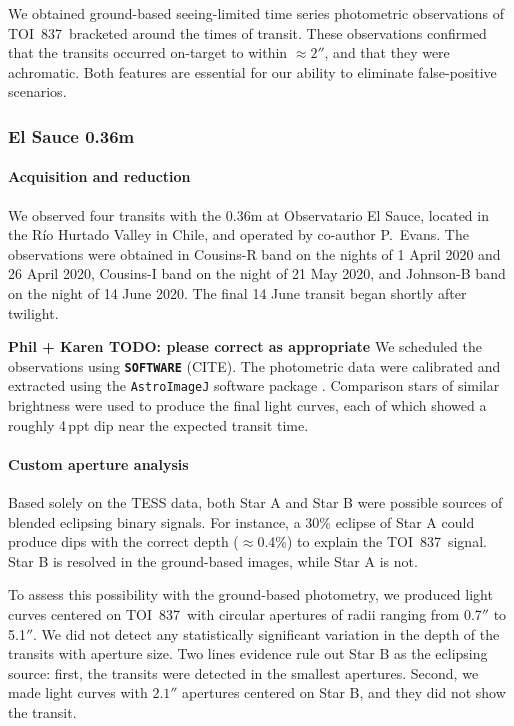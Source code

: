 \documentclass[12pt,twocolumn,tighten]{aastex63}
\newcommand{\tn}{TOI~837} %
\begin{document}
We obtained ground-based seeing-limited time series photometric
observations of \tn\ bracketed around the times of transit.  These
observations confirmed that the transits occurred on-target to within
$\approx 2''$, and that they were achromatic. Both features are
essential for our ability to eliminate false-positive scenarios.

\subsubsection{El Sauce 0.36m}

\paragraph{Acquisition and reduction}
We observed four transits with the 0.36m at Observatario El Sauce,
located in the R\'io Hurtado Valley in Chile, and operated by
co-author P{.}~Evans.  The observations were obtained in Cousins-R
band on the nights of 1 April 2020 and 26 April 2020, Cousins-I band
on the night of 21 May 2020, and Johnson-B band on the night of 14
June 2020.  The final 14 June transit began shortly after twilight.

{\bf Phil + Karen TODO: please correct as appropriate}
We scheduled the observations using {\bf \texttt{SOFTWARE}} (CITE).
The photometric data were calibrated and extracted using the
\texttt{AstroImageJ} software package
\citep{collins_astroimagej_2017}.  Comparison stars of similar
brightness were used to produce the final light curves, each of which
showed a roughly 4$\,$ppt dip near the expected transit time.


\paragraph{Custom aperture analysis}
Based solely on the TESS data, both Star A and Star B
were possible sources of blended eclipsing binary signals.
For instance, a 30\% eclipse of Star A could produce
dips with the correct depth ($\approx$0.4\%) to explain the \tn\ signal.
Star B is resolved in the ground-based images, while Star A is not.

To assess this possibility with the ground-based photometry, we
produced light curves centered on \tn\ with
circular apertures of radii ranging from 0.7$''$ to 5.1$''$.
We did not detect any statistically significant variation in the depth
of the transits with aperture size.
Two lines evidence rule out Star B as the eclipsing source:
first, the transits
were detected in the smallest apertures.
Second, we made light curves with $2.1''$ apertures centered on Star B,
and they did not show the transit.
\end{document}
